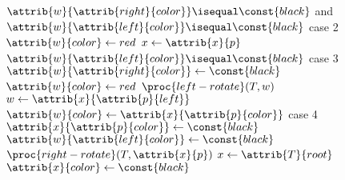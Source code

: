 \documentclass{article}
\begin{document}
\begin{codebox}
            \End
\li         \If $\attrib{w}{\attrib{right}{color}} \isequal \const{black}$ and $\attrib{w}{\attrib{left}{color}} \isequal \const{black}$ \Comment case 2
\li         \Then
                $\attrib{w}{color} \gets{red}$
\li             $x \gets{\attrib{x}{p}}$
\li         \Else
\li             \If $\attrib{w}{\attrib{left}{color}} \isequal \const{black}$ \Comment case 3
\li             \Then
                    $\attrib{w}{\attrib{right}{color}} \gets{\const{black}}$
\li                 $\attrib{w}{color} \gets{red}$
\li                 $\proc{left-rotate}(T, w)$
\li                 $w \gets{\attrib{x}{\attrib{p}{left}}}$
                \End
\li             $\attrib{w}{color} \gets{\attrib{x}{\attrib{p}{color}}}$ \Comment case 4
\li             $\attrib{x}{\attrib{p}{color}} \gets{\const{black}}$
\li             $\attrib{w}{\attrib{left}{color}} \gets{\const{black}}$
\li             $\proc{right-rotate}(T, \attrib{x}{p})$
\li             $x \gets{\attrib{T}{root}}$
            \End
        \End
    \End
\li $\attrib{x}{color} \gets{\const{black}}$
\end{codebox}
\end{document}
